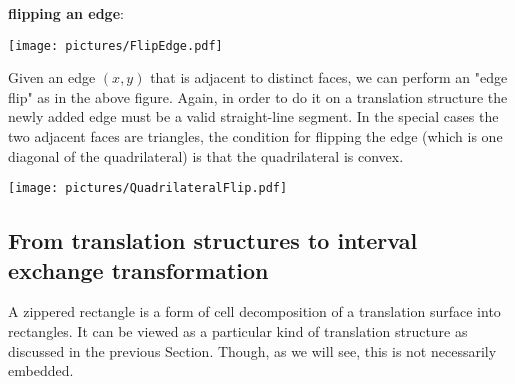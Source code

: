 \documentclass{article}
\begin{document}
\textbf{flipping an edge}:
\begin{center}\texttt{[image: pictures/FlipEdge.pdf]}\end{center}
Given an edge $(x,y)$ that is adjacent to distinct faces, we can perform an
"edge flip" as in the above figure. Again, in order to do it on a translation
structure the newly added edge must be a valid straight-line segment.
In the special cases the two adjacent faces are triangles, the condition
for flipping the edge (which is one diagonal of the quadrilateral) is that the
quadrilateral is convex.
\begin{center}\texttt{[image: pictures/QuadrilateralFlip.pdf]}\end{center}

\subsection{From translation structures to interval exchange transformation}
A zippered rectangle is a form of cell decomposition of a translation
surface into rectangles. It can be viewed as a particular kind of translation
structure as discussed in the previous Section. Though, as we will see, this
is not necessarily embedded.
\end{document}

